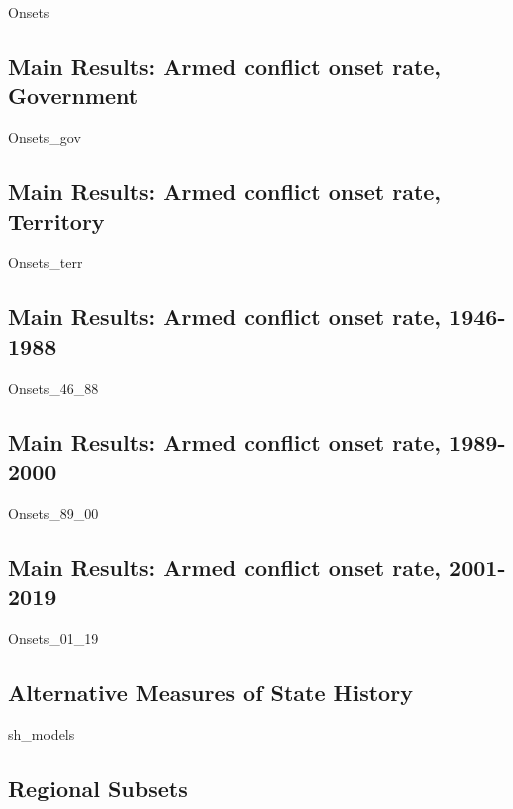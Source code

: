     {Onsets}
    
\clearpage    

\subsection{Main Results: Armed conflict onset rate, Government}

    {Onsets_gov}
    
        
\clearpage    
  
\subsection{Main Results: Armed conflict onset rate, Territory}

    {Onsets_terr}
    
    
\clearpage        

\subsection{Main Results: Armed conflict onset rate, 1946-1988}

    {Onsets_46_88}
 
    
\clearpage     
  
\subsection{Main Results: Armed conflict onset rate, 1989-2000}

    {Onsets_89_00}
    
    
\clearpage    


\subsection{Main Results: Armed conflict onset rate, 2001-2019}

    {Onsets_01_19}
    
    
\clearpage    

\subsection{Alternative Measures of State History}

    {sh_models}
    
\clearpage    

\subsection{Regional Subsets}

